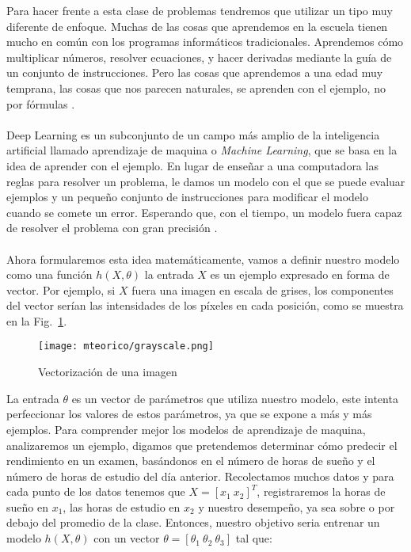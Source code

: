     Para hacer frente a esta clase de problemas tendremos que utilizar un tipo muy diferente de enfoque. Muchas de las cosas que aprendemos en la escuela tienen mucho en común con los programas informáticos tradicionales. Aprendemos cómo multiplicar números, resolver ecuaciones, y hacer derivadas mediante la guía de un conjunto de instrucciones. Pero las cosas que aprendemos a una edad muy temprana, las cosas que nos parecen naturales, se aprenden con el ejemplo, no por fórmulas \cite{dlBook}.
    \\\\
    Deep Learning es un subconjunto de un campo más amplio de la inteligencia artificial llamado aprendizaje de maquina o \textit{Machine Learning}, que se basa en la idea de aprender con el ejemplo. En lugar de enseñar a una computadora las reglas para resolver un problema, le damos un modelo con el que se puede evaluar ejemplos y un pequeño conjunto de instrucciones para modificar el modelo cuando se comete un error. Esperando que, con el tiempo, un modelo fuera capaz de resolver el problema con gran precisión \cite{dlBook}.
    \\\\
    Ahora formularemos esta idea matemáticamente, vamos a definir nuestro modelo como una función $h(X,\theta)$ la entrada $X$ es un ejemplo expresado en forma de vector. Por ejemplo, si $X$ fuera una imagen en escala de grises, los componentes del vector serían las intensidades de los píxeles en cada posición, como se muestra en la Fig.~\ref{fig:gscale}.
    \begin{figure}[htp]
        \centering
        \texttt{[image: mteorico/grayscale.png]}
        \caption{Vectorización de una imagen}
        \label{fig:gscale}
    \end{figure}

    La entrada $\theta$ es un vector de parámetros que utiliza nuestro modelo, este intenta perfeccionar los valores de estos parámetros, ya que se expone a más y más ejemplos. Para comprender mejor los modelos de aprendizaje de maquina, analizaremos un ejemplo, digamos que pretendemos determinar cómo predecir el rendimiento en un examen, basándonos en el número de horas de sueño y el número de horas de estudio del día anterior. Recolectamos muchos datos y para cada punto de los datos tenemos que $X=[x_1\ x_2]^T$, registraremos la horas de sueño en $x_1$, las horas de estudio en $x_2$ y nuestro desempeño, ya sea sobre o por debajo del promedio de la clase. Entonces, nuestro objetivo seria entrenar un modelo $h(X,\theta)$ con un vector $\theta=[\theta_1\ \theta_2\ \theta_3]$ tal que:

